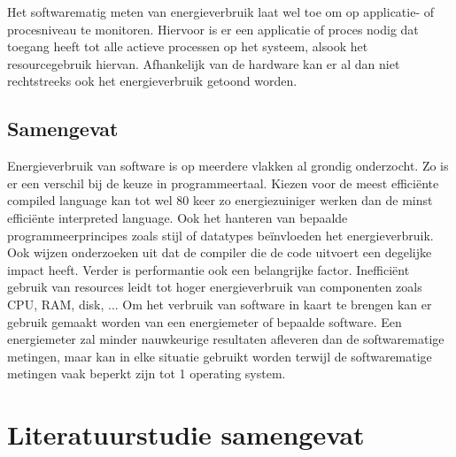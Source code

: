 Het softwarematig meten van energieverbruik laat wel toe om op applicatie- of procesniveau te monitoren. Hiervoor is er een applicatie of proces nodig dat toegang heeft tot alle actieve processen op het systeem, alsook het resourcegebruik hiervan. Afhankelijk van de hardware kan er al dan niet rechtstreeks ook het energieverbruik getoond worden. \bigskip


\subsection{Samengevat}
Energieverbruik van software is op meerdere vlakken al grondig onderzocht. Zo is er een verschil bij de keuze in programmeertaal. Kiezen voor de meest efficiënte compiled language kan tot wel 80 keer zo energiezuiniger werken dan de minst efficiënte interpreted language. Ook het hanteren van bepaalde programmeerprincipes zoals stijl of datatypes beïnvloeden het energieverbruik. Ook wijzen onderzoeken uit dat de compiler die de code uitvoert een degelijke impact heeft. Verder is performantie ook een belangrijke factor. Inefficiënt gebruik van resources leidt tot hoger energieverbruik van componenten zoals CPU, RAM, disk, ... Om het verbruik van software in kaart te brengen kan er gebruik gemaakt worden van een energiemeter of bepaalde software. Een energiemeter zal minder nauwkeurige resultaten afleveren dan de softwarematige metingen, maar kan in elke situatie gebruikt worden terwijl de softwarematige metingen vaak beperkt zijn tot 1 operating system. 

\section{Literatuurstudie samengevat}





